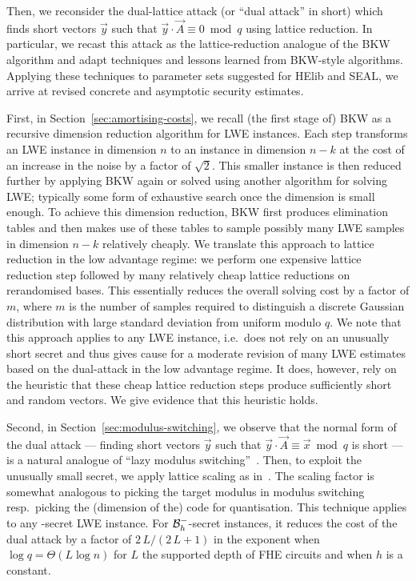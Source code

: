 \documentclass[a4paper]{llncs}
\begin{document}
Then, we reconsider the dual-lattice attack (or ``dual attack'' in short) which finds short vectors $\vec{y}$ such that $\vec{y} ⋅ \vec{A} ≡ 0 \bmod q$ using lattice reduction. In particular, we recast this attack as the lattice-reduction analogue of the BKW algorithm and adapt techniques and lessons learned from BKW-style algorithms. Applying these techniques to parameter sets suggested for HElib and SEAL, we arrive at revised concrete and asymptotic security estimates\@.

First, in Section~\ref{sec:amortising-costs}, we recall (the first stage of) BKW as a recursive dimension reduction algorithm for LWE instances. Each step transforms an LWE instance in dimension $n$ to an instance in dimension $n-k$ at the cost of an increase in the noise by a factor of $\sqrt{2}$. This smaller instance is then reduced further by applying BKW again or solved using another algorithm for solving LWE\@; typically some form of exhaustive search once the dimension is small enough. To achieve this dimension reduction, BKW first produces elimination tables and then makes use of these tables to sample possibly many LWE samples in dimension \(n-k\) relatively cheaply. We translate this approach to lattice reduction in the low advantage regime: we perform one expensive lattice reduction step followed by many relatively cheap lattice reductions on rerandomised bases. This essentially reduces the overall solving cost by a factor of \(m\), where \(m\) is the number of samples required to distinguish a discrete Gaussian distribution with large standard deviation from uniform modulo \(q\). We note that this approach applies to any LWE instance, i.e.\ does not rely on an unusually short secret and thus gives cause for a moderate revision of many LWE estimates based on the dual-attack in the low advantage regime. It does, however, rely on the heuristic that these cheap lattice reduction steps produce sufficiently short and random vectors. We give evidence that this heuristic holds.

Second, in Section~\ref{sec:modulus-switching}, we observe that the normal form of the dual attack --- finding short vectors \(\vec{y}\) such that $\vec{y} ⋅ \vec{A} ≡ \vec{x} \bmod q$ is short --- is a natural analogue of ``lazy modulus switching''~\cite{PKC:AFFP14}. Then, to exploit the unusually small secret, we apply lattice scaling as in~\cite{ACISP:BaiGal14}. The scaling factor is somewhat analogous to picking the target modulus in modulus switching resp.~picking the (dimension of the) code for quantisation. This technique applies to any \B{}-secret LWE instance. For \(\B[h]{-}\)-secret instances, it reduces the cost of the dual attack by a factor of \(2\,L/(2\,L+1)\) in the exponent when \(\log q = \Theta\left( L \log n \right)\) for \(L\) the supported depth of FHE circuits and when \(h\) is a constant.
\end{document}
